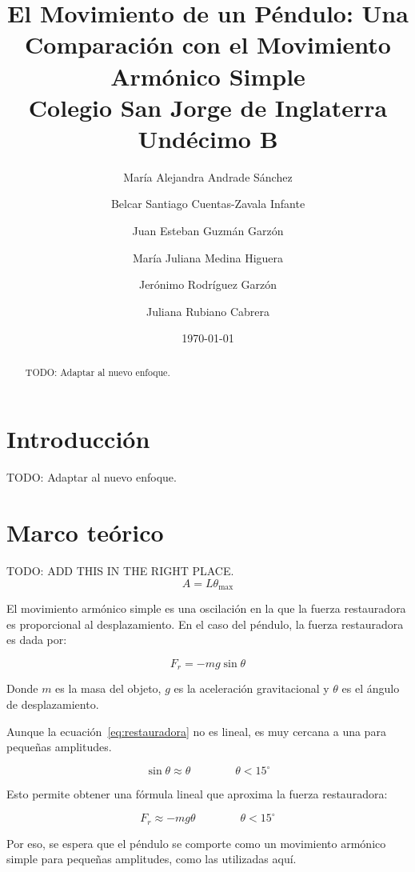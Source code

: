 \documentclass[twocolumn]{article}
\title{
  El Movimiento de un Péndulo: Una Comparación con el Movimiento
  Armónico Simple \\
  {\large Colegio San Jorge de Inglaterra \\
  Undécimo B}
}
\author{
  María Alejandra Andrade Sánchez \and
  Belcar Santiago Cuentas-Zavala Infante \and
  Juan Esteban Guzmán Garzón \and
  María Juliana Medina Higuera \and
  Jerónimo Rodríguez Garzón \and
  Juliana Rubiano Cabrera
}
\date{\today}
\numberwithin{table}{section}
\begin{document}
\maketitle

\newpage
\tableofcontents

\begin{abstract}
  {\color{workblue} TODO\@: Adaptar al nuevo enfoque.}
\end{abstract}

\section{Introducción}

{\color{workblue}TODO\@: Adaptar al nuevo enfoque.}

\section{Marco teórico}

{\color{workblue}TODO\@: ADD THIS IN THE RIGHT PLACE.}
\begin{equation}
  A = L\theta_{\max}
\end{equation}

El movimiento armónico simple es una oscilación en la que la fuerza restauradora
es proporcional al desplazamiento. En el caso del péndulo, la fuerza
restauradora es dada por:

\begin{equation}\label{eq:restauradora}
  F_{r} = -mg\sin{\theta}
\end{equation}

Donde $m$ es la masa del objeto, $g$ es la aceleración gravitacional y $\theta$
es el ángulo de desplazamiento.

Aunque la ecuación~\eqref{eq:restauradora} no es lineal, es muy cercana
a una para pequeñas amplitudes.

\begin{equation*}
  \sin{\theta} \approx \theta \qquad\qquad \theta < 15^{\circ}
\end{equation*}

Esto permite obtener una fórmula lineal que aproxima la fuerza restauradora:

\begin{equation}\label{eq:restauradora_aprox_por_alpha}
  F_{r} \approx -mg\theta \qquad\qquad \theta < 15^{\circ}
\end{equation}

Por eso, se espera que el péndulo se comporte como un movimiento
armónico simple para pequeñas amplitudes, como las utilizadas aquí.
\end{document}
